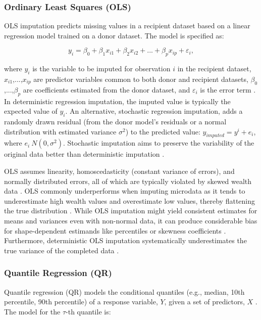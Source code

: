 \subsubsection{Ordinary Least Squares (OLS)}

OLS imputation predicts missing values in a recipient dataset based on a linear regression model trained on a donor dataset. The model is specified as:

$$y_i = \beta_0 + \beta_1 x_{i1} + \beta_2 x_{i2} + ... + \beta_p x_{ip} + \varepsilon_i,$$

where $y_i$ is the variable to be imputed for observation $i$ in the recipient dataset, $x_{i1}$,...,$x_{ip}$ are predictor variables common to both donor and recipient datasets, $\beta_0$,...,$\beta_p$ are coefficients estimated from the donor dataset, and $\varepsilon_i$ is the error term \citep{bruch2023imputation}. In deterministic regression imputation, the imputed value is typically the expected value of $y_i$. An alternative, stochastic regression imputation, adds a randomly drawn residual (from the donor model's residuals or a normal distribution with estimated variance $\sigma^2$) to the predicted value: $y_{imputed} = y^i + e_i$, where $e_i~N(0,\sigma^2)$. Stochastic imputation aims to preserve the variability of the original data better than deterministic imputation \citep{anil_regression}.

OLS assumes linearity, homoscedasticity (constant variance of errors), and normally distributed errors, all of which are typically violated by skewed wealth data \citep{vonhippel2007should}. OLS commonly underperforms when imputing microdata as it tends to underestimate high wealth values and overestimate low values, thereby flattening the true distribution \citep{woodruff2023survey}. While OLS imputation might yield consistent estimates for means and variances even with non-normal data, it can produce considerable bias for shape-dependent estimands like percentiles or skewness coefficients \citep{vonhippel2007should}. Furthermore, deterministic OLS imputation systematically underestimates the true variance of the completed data \citep{barcelo2008impact}. 

\subsubsection{Quantile Regression (QR)}

Quantile regression (QR) models the conditional quantiles (e.g., median, 10th percentile, 90th percentile) of a response variable, $Y$, given a set of predictors, $X$ \citep{koenker1978regression}. The model for the $\tau$-th quantile is:

